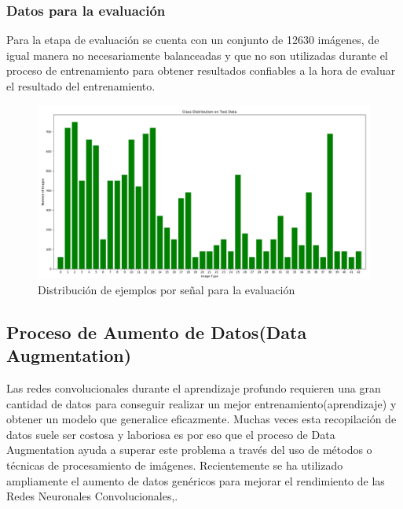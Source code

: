 	\subsubsection{Datos para la evaluación}
		Para la etapa de evaluación se cuenta con un conjunto de 12630 imágenes, de igual manera no necesariamente balanceadas y que no son utilizadas durante el proceso de entrenamiento para obtener resultados confiables a la hora de evaluar el resultado del entrenamiento. 

		\begin{figure}[H]
			\includegraphics[width=1\textwidth]{images/desarrollo/histograms/initialTest12630}
			\begin{center}
			\caption{\small{Distribución de ejemplos por señal para la evaluación}}
			\vspace{-1em}
		{\small{\fontsize{10}{16.8}\selectfont {Fuente propia}}}
			\end{center}
			\vspace{-1.5em}
		\end{figure}


\subsection{Proceso de Aumento de Datos(Data Augmentation)}

	Las redes convolucionales durante el aprendizaje profundo requieren una gran cantidad de datos para conseguir realizar un mejor entrenamiento(aprendizaje) y obtener un modelo que generalice eficazmente. Muchas veces esta recopilación de datos suele ser costosa y laboriosa es por eso que el proceso de Data Augmentation ayuda a superar este problema a través del uso de métodos o técnicas de procesamiento de imágenes. Recientemente se ha utilizado ampliamente el aumento de datos genéricos para mejorar el rendimiento de las Redes Neuronales Convolucionales,\citep{DL_augmentData}. 

